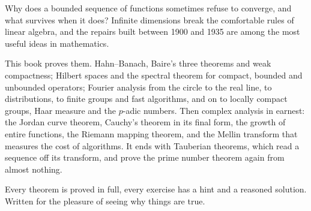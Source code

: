 Why does a bounded sequence of functions sometimes refuse to converge, and what survives when it does? Infinite dimensions
break the comfortable rules of linear algebra, and the repairs built between 1900 and 1935 are among the most useful ideas
in mathematics.

This book proves them. Hahn--Banach, Baire's three theorems and weak compactness; Hilbert spaces and the spectral theorem
for compact, bounded and unbounded operators; Fourier analysis from the circle to the real line, to distributions, to finite
groups and fast algorithms, and on to locally compact groups, Haar measure and the $p$-adic numbers. Then complex analysis
in earnest: the Jordan curve theorem, Cauchy's theorem in its final form, the growth of entire functions, the Riemann
mapping theorem, and the Mellin transform that measures the cost of algorithms. It ends with Tauberian theorems, which read
a sequence off its transform, and prove the prime number theorem again from almost nothing.

Every theorem is proved in full, every exercise has a hint and a reasoned solution. Written for the pleasure of seeing why things are true.
